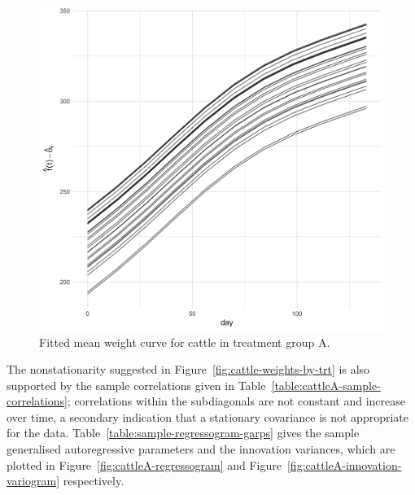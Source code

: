 \documentclass[12pt]{article}
\theoremstyle{definition}
\begin{document}
\begin{figure}[H] \label{fig:cattleA-smoothed-weights-vs-time}
\caption{Fitted mean weight curve for cattle in treatment group A. }
\begin{center}
\includegraphics[width = \textwidth]{img/cattle/cattleA-weights-vs-time-mean-fit}
\end{center}
\end{figure} 

The nonstationarity suggested in Figure~\ref{fig:cattle-weights-by-trt} is also supported by the sample correlations given in Table~\ref{table:cattleA-sample-correlations}; correlations within the subdiagonals are not constant and increase over time, a secondary indication that a stationary covariance is not appropriate for the data.  Table~\ref{table:sample-regressogram-garps} gives the sample generalised autoregressive parameters and the innovation variances, which are plotted in Figure~\ref{fig:cattleA-regressogram} and Figure~\ref{fig:cattleA-innovation-variogram} respectively. 
\end{document}
